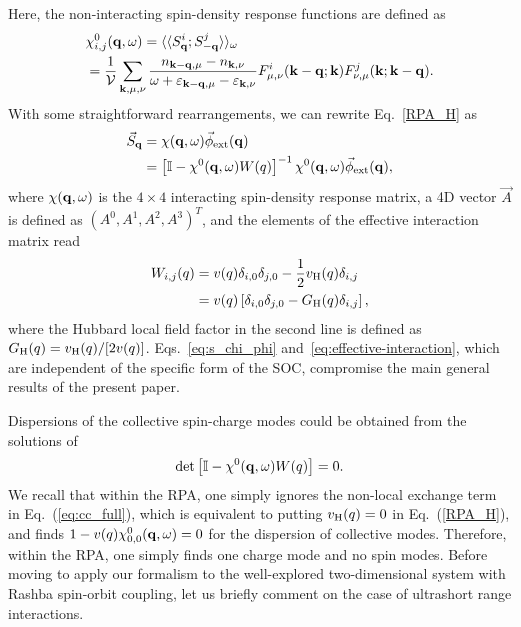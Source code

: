 \documentclass[aps, pra, reprint,superscriptaddress]{revtex4-1}
\def\be{\begin{equation}}
\def\ee{\end{equation}}
\def\kv{{\bf k}}
\def\qv{{\bf q}}
\def\Vc{{\cal V}}
\begin{document}
Here, the non-interacting spin-density response functions are defined as
\be\label{eq:chi0_matrix}
\begin{split}
&\chi^{0}_{i,j}(\qv,\omega)=\langle\langle  S^{i}_{\qv}; S^{j}_{-\qv}\rangle\rangle_\omega 
\\
&=\frac{1}{\Vc}\sum_{\kv,\mu,\nu} 
\frac{n_{\kv-\qv,\mu}-n_{\kv,\nu}}{\omega +\varepsilon_{\kv-\qv,\mu}-\varepsilon_{\kv,\nu}}
F^{i}_{\mu,\nu}(\kv-\qv;\kv)F^{j}_{\nu,\mu}(\kv;\kv-\qv).
\end{split}
\ee
With some straightforward rearrangements, we can rewrite Eq.~\eqref{RPA_H} as
\be\label{eq:s_chi_phi}
\begin{split}
{\vec S}_\qv&=\chi(\qv,\omega) {\vec \phi}_{\rm ext}(\qv)\\
&=\left[\mathbb{I}-\chi^0(\qv,\omega)W(q)\right]^{-1}\chi^0(\qv,\omega) {\vec \phi}_{\rm ext}(\qv),
\end{split}
\ee
where $\chi(\qv,\omega)$ is the $4\times 4$ interacting spin-density response matrix, a 4D vector ${\vec A}$ is defined as $\left(A^0, A^1,A^2,A^3\right)^T$, and  the elements of the effective interaction matrix read
\be\label{eq:effective-interaction}
\begin{split}
W_{i,j}(q)&=v(q)\delta_{i,0}\delta_{j,0}-\frac{1}{2}v_{\rm H}(q)\delta_{i,j}\\
&=v(q)\left[\delta_{i,0}\delta_{j,0}-G_{\rm H}(q)\delta_{i,j}\right],
\end{split}
\ee
where the Hubbard local field factor in the second line is defined as $G_{\rm H}(q)=v_{\rm H}(q)/[2v(q)]$. Eqs.~\eqref{eq:s_chi_phi} and~\eqref{eq:effective-interaction}, which are independent of the specific form of the SOC, compromise the main general results of the present paper.



Dispersions of the collective spin-charge modes could be obtained from the solutions of 
\be\label{det}
\det \left[\mathbb{I}-\chi^0(\qv,\omega)W(q)\right]=0.
\ee
We recall that within the RPA, one simply ignores the non-local exchange term in Eq.~(\ref{eq:cc_full}), which is equivalent to putting $v_{\rm H}(q)=0$ in Eq.~(\ref{RPA_H}), and finds
$1-v(q)\chi^0_{0,0}(\qv,\omega)=0$ for the dispersion of collective modes.
Therefore, within the RPA, one simply finds one charge mode and no spin modes. 
Before moving to apply our formalism to the well-explored two-dimensional system with Rashba spin-orbit coupling, let us briefly comment on the case of ultrashort range interactions.
\end{document}
